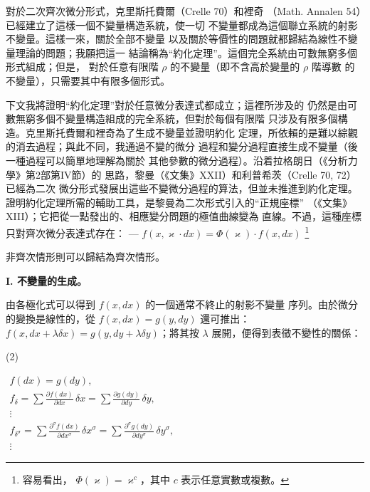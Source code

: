 \documentclass[11pt]{article}
\providecommand{\srcfn}[2]{%
  \begingroup
  \renewcommand{\thefootnote}{#1}%
  \footnote{#2}%
  \addtocounter{footnote}{-1}%
  \endgroup}
\providecommand{\srcnumdisplay}[3][3.4em]{%
  \par\smallskip\noindent
  \begin{minipage}[t]{#1}\vspace*{0pt}#2\end{minipage}%
  \begin{minipage}[t]{\dimexpr\linewidth-#1\relax}\vspace*{0pt}\centering
  \(\displaystyle #3\)
  \end{minipage}\par\smallskip}
\begin{document}
對於二次齊次微分形式，克里斯托費爾（Crelle 70）和裡奇
（Math. Annalen 54）已經建立了這樣一個不變量構造系統，使一切
不變量都成為這個聯立系統的射影不變量。這樣一來，關於全部不變量
以及關於等價性的問題就都歸結為線性不變量理論的問題；我願把這一
結論稱為“約化定理”。這個完全系統由可數無窮多個形式組成；但是，
對於任意有限階 \(\rho\) 的不變量（即不含高於變量的 \(\rho\) 階導數
的不變量），只需要其中有限多個形式。

下文我將證明“約化定理”對於任意微分表達式都成立；這裡所涉及的
仍然是由可數無窮多個不變量構造組成的完全系統，但對於每個有限階
只涉及有限多個構造。克里斯托費爾和裡奇為了生成不變量並證明約化
定理，所依賴的是難以綜觀的消去過程；與此不同，我通過不變的微分
過程和變分過程直接生成不變量（後一種過程可以簡單地理解為關於
其他參數的微分過程）。沿着拉格朗日（《分析力學》第2部第IV節）的
思路，黎曼（《文集》XXII）和利普希茨（Crelle 70, 72）已經為二次
微分形式發展出這些不變微分過程的算法，但並未推進到約化定理。
證明約化定理所需的輔助工具，是黎曼為二次形式引入的“正規座標”
（《文集》XIII）；它把從一點發出的、相應變分問題的極值曲線變為
直線。不過，這種座標只對齊次微分表達式存在：
--- \(f(x,\varkappa\cdot dx)=\Phi(\varkappa)\cdot f(x,dx)\)\srcfn{1)}{容易看出，
\(\Phi(\varkappa)=\varkappa^c\)，其中 \(c\) 表示任意實數或複數。}
非齊次情形則可以歸結為齊次情形。

\begin{center}
\textbf{I. 不變量的生成。}
\end{center}

由各極化式可以得到 \(f(x,dx)\) 的一個通常不終止的射影不變量
序列。由於微分的變換是線性的，從 \(f(x,dx)=g(y,dy)\) 還可推出：
\(f(x,dx+\lambda\delta x)=g(y,dy+\lambda\delta y)\)；將其按
\(\lambda\) 展開，便得到表徵不變性的關係：
\srcnumdisplay{(2)}{%
\begin{gathered}
f(dx)=g(dy),\\
f_\delta=\sum\frac{\partial f(dx)}{\partial dx}\,\delta x
       =\sum\frac{\partial g(dy)}{\partial dy}\,\delta y,\\
\vdots\\
f_{\delta^\sigma}=
\sum\frac{\partial^\sigma f(dx)}{\partial dx^\sigma}\,\delta x^\sigma
=
\sum\frac{\partial^\sigma g(dy)}{\partial dy^\sigma}\,\delta y^\sigma,\\
\vdots
\end{gathered}
}
\end{document}

